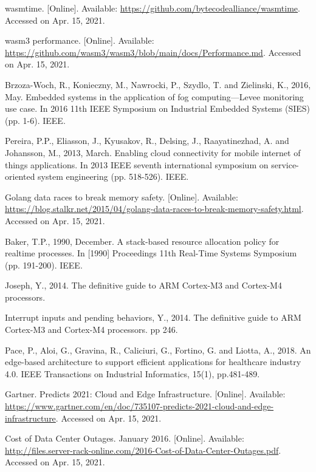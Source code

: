 \begin{thebibliography}{00}
 wasmtime. [Online]. Available: \url{https://github.com/bytecodealliance/wasmtime}. Accessed on Apr. 15, 2021.

 wasm3 performance. [Online]. Available: \url{https://github.com/wasm3/wasm3/blob/main/docs/Performance.md}. Accessed on Apr. 15, 2021.

 Brzoza-Woch, R., Konieczny, M., Nawrocki, P., Szydlo, T. and Zielinski, K., 2016, May. Embedded systems in the application of fog computing—Levee monitoring use case. In 2016 11th IEEE Symposium on Industrial Embedded Systems (SIES) (pp. 1-6). IEEE.

 Pereira, P.P., Eliasson, J., Kyusakov, R., Delsing, J., Raayatinezhad, A. and Johansson, M., 2013, March. Enabling cloud connectivity for mobile internet of things applications. In 2013 IEEE seventh international symposium on service-oriented system engineering (pp. 518-526). IEEE.

 Golang data races to break memory safety. [Online]. Available: \url{https://blog.stalkr.net/2015/04/golang-data-races-to-break-memory-safety.html}. Accessed on Apr. 15, 2021.

 Baker, T.P., 1990, December. A stack-based resource allocation policy for realtime processes. In [1990] Proceedings 11th Real-Time Systems Symposium (pp. 191-200). IEEE.

 Joseph, Y., 2014. The definitive guide to ARM Cortex-M3 and Cortex-M4 processors.

 Interrupt inputs and pending behaviors, Y., 2014. The definitive guide to ARM Cortex-M3 and Cortex-M4 processors. pp 246.

 Pace, P., Aloi, G., Gravina, R., Caliciuri, G., Fortino, G. and Liotta, A., 2018. An edge-based architecture to support efficient applications for healthcare industry 4.0. IEEE Transactions on Industrial Informatics, 15(1), pp.481-489.

 Gartner. Predicts 2021: Cloud and Edge Infrastructure. [Online]. Available: \url{https://www.gartner.com/en/doc/735107-predicts-2021-cloud-and-edge-infrastructure}. Accessed on Apr. 15, 2021.

 Cost of Data Center Outages. January 2016. [Online]. Available: \url{http://files.server-rack-online.com/2016-Cost-of-Data-Center-Outages.pdf}. Accessed on Apr. 15, 2021.


\end{thebibliography}

